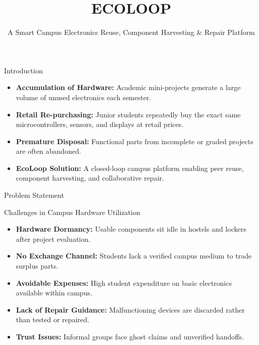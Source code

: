 \documentclass{beamer}
\title{\textbf{ECOLOOP}}
\subtitle{A Smart Campus Electronics Reuse, Component Harvesting \& Repair Platform}
\author{}
\institute[NSS College of Engineering]{M.Tech CSE, ECE\\[0.15cm]
NSS College of Engineering, Palakkad}
\date{}
\begin{document}

\begin{frame}
    \titlepage
\end{frame}


\begin{frame}{Introduction}

\begin{itemize}
    \setlength\itemsep{0.4cm}
    \item \textbf{Accumulation of Hardware:} Academic mini-projects generate a large volume of unused electronics each semester.

    \item \textbf{Retail Re-purchasing:} Junior students repeatedly buy the exact same microcontrollers, sensors, and displays at retail prices.

    \item \textbf{Premature Disposal:} Functional parts from incomplete or graded projects are often abandoned.

    \item \textbf{EcoLoop Solution:} A closed-loop campus platform enabling peer reuse, component harvesting, and collaborative repair.
\end{itemize}

\end{frame}


\begin{frame}{Problem Statement}

\begin{block}{Challenges in Campus Hardware Utilization}
\begin{itemize}
    \setlength\itemsep{0.25cm}
    \item \textbf{Hardware Dormancy:} Usable components sit idle in hostels and lockers after project evaluation.
    \item \textbf{No Exchange Channel:} Students lack a verified campus medium to trade surplus parts.
    \item \textbf{Avoidable Expenses:} High student expenditure on basic electronics available within campus.
    \item \textbf{Lack of Repair Guidance:} Malfunctioning devices are discarded rather than tested or repaired.
    \item \textbf{Trust Issues:} Informal groups face ghost claims and unverified handoffs.
\end{itemize}
\end{block}

\end{frame}
\end{document}
